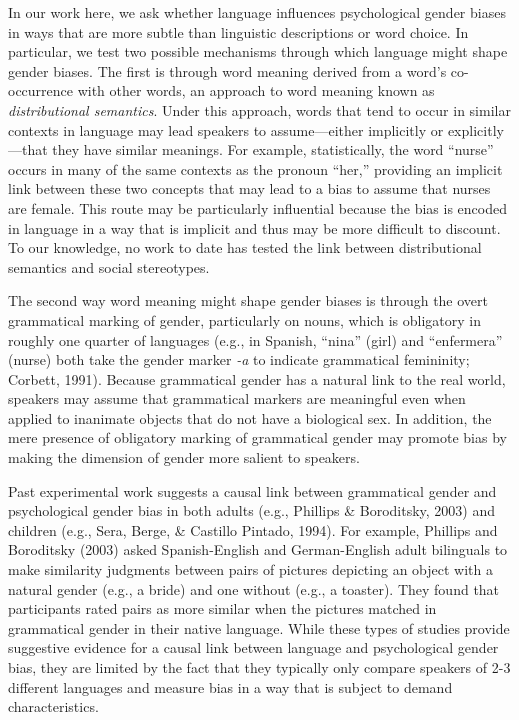 \documentclass[man,floatsintext]{apa6}
\theoremstyle{definition}
\theoremstyle{definition}
\theoremstyle{definition}
\theoremstyle{remark}
\begin{document}
In our work here, we ask whether language influences psychological
gender biases in ways that are more subtle than linguistic descriptions
or word choice. In particular, we test two possible mechanisms through
which language might shape gender biases. The first is through word
meaning derived from a word's co-occurrence with other words, an
approach to word meaning known as \emph{distributional semantics}. Under
this approach, words that tend to occur in similar contexts in language
may lead speakers to assume---either implicitly or explicitly---that
they have similar meanings. For example, statistically, the word
\enquote{nurse} occurs in many of the same contexts as the pronoun
\enquote{her,} providing an implicit link between these two concepts
that may lead to a bias to assume that nurses are female. This route may
be particularly influential because the bias is encoded in language in a
way that is implicit and thus may be more difficult to discount. To our
knowledge, no work to date has tested the link between distributional
semantics and social stereotypes.

The second way word meaning might shape gender biases is through the
overt grammatical marking of gender, particularly on nouns, which is
obligatory in roughly one quarter of languages (e.g., in Spanish,
``nina'' (girl) and ``enfermera'' (nurse) both take the gender marker
\emph{-a} to indicate grammatical femininity; Corbett, 1991). Because
grammatical gender has a natural link to the real world, speakers may
assume that grammatical markers are meaningful even when applied to
inanimate objects that do not have a biological sex. In addition, the
mere presence of obligatory marking of grammatical gender may promote
bias by making the dimension of gender more salient to speakers.

Past experimental work suggests a causal link between grammatical gender
and psychological gender bias in both adults (e.g., Phillips \&
Boroditsky, 2003) and children (e.g., Sera, Berge, \& Castillo Pintado,
1994). For example, Phillips and Boroditsky (2003) asked Spanish-English
and German-English adult bilinguals to make similarity judgments between
pairs of pictures depicting an object with a natural gender (e.g., a
bride) and one without (e.g., a toaster). They found that participants
rated pairs as more similar when the pictures matched in grammatical
gender in their native language. While these types of studies provide
suggestive evidence for a causal link between language and psychological
gender bias, they are limited by the fact that they typically only
compare speakers of 2-3 different languages and measure bias in a way
that is subject to demand characteristics.
\end{document}

